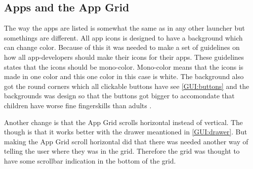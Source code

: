 \subsection{Apps and the App Grid}
\label{GUI:app}

The way the apps are listed is somewhat the same as in any other launcher but somethings are different. All app icons is designed to have a background which can change color. Because of this it was needed to make a set of guidelines on how all app-developers should make their icons for their apps. These guidelines states that the icons should be mono-color. Mono-color means that the icons is made in one color and this one color in this case is white.
The background also got the round corners which all clickable buttons have see \autoref{GUI:buttons} and the backgrounds was design so that the buttons got bigger to accomondate that children have worse fine fingerskills than adults .

Another change is that the App Grid scrolls horizontal instead of vertical. The though is that it works better with the drawer meantioned in \autoref{GUI:drawer}. But making the App Grid scroll horizontal did that there was needed another way of telling the user where they was in the grid. Therefore the grid was thought to have some scrollbar indication in the bottom of the grid.